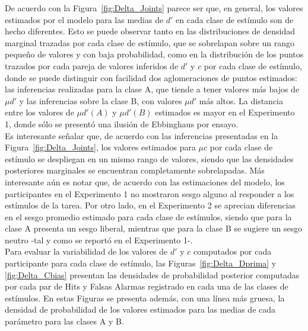 De acuerdo con la Figura~\ref{fig:Delta_Joints} parece ser que, en general, los valores estimados por el modelo para las medias de $d'$ en cada clase de estímulo son de hecho diferentes. Esto se puede observar tanto en las distribuciones de densidad marginal trazadas por cada clase de estímulo, que se sobrelapan sobre un rango pequeño de valores y con baja probabilidad, como en la distribución de los puntos trazados por cada pareja de valores inferidos de $d'$ y $c$ por cada clase de estímulo, donde se puede distinguir con facilidad dos aglomeraciones de puntos estimados: las inferencias realizadas para la clase A, que tiende a tener valores más bajos de $\mu d'$ y las inferencias sobre la clase B, con valores $\mu d'$ más altos. La distancia entre los valores de $\mu d'(A)$ y $\mu d'(B)$ estimados es mayor en el Experimento 1, donde sólo se presentó una ilusión de Ebbinghaus por ensayo.\\


Es interesante señalar que, de acuerdo con las inferencias presentadas en la Figura~\ref{fig:Delta_Joints}, los valores estimados para $\mu c$ por cada clase de estímulo se despliegan en un mismo rango de valores, siendo que las densidades posteriores marginales se encuentran completamente sobrelapadas. Más interesante aún es notar que, de acuerdo con las estimaciones del modelo, los participantes en el Experimento 1 no mostraron sesgo alguno al responder a los estímulos de la tarea. Por otro lado, en el Experimento 2 se aprecian diferencias en el sesgo promedio estimado para cada clase de estímulos, siendo que para la clase A presenta un sesgo liberal, mientras que para la clase B se sugiere un sesgo neutro -tal y como se reportó en el Experimento 1-.\\

Para evaluar la variabilidad de los valores de $d'$ y $c$ computados por cada participante para cada clase de estímulo, las Figuras~\ref{fig:Delta_Dprima} y \ref{fig:Delta_Cbias} presentan las densidades de probabilidad posterior computadas por cada par de Hits y Falsas Alarmas registrado en cada una de las clases de estímulos. En estas Figuras se presenta además, con una línea más gruesa, la densidad de probabilidad de los valores estimados para las medias de cada parámetro para las clases A y B.\\

